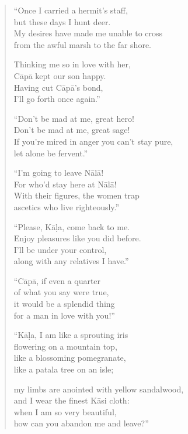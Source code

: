 \documentclass[12pt,openany]{book}%
\begin{document}
\begin{verse}%
“Once I carried a hermit’s staff, \\
but these days I hunt deer. \\
My desires have made me unable to cross \\
from the awful marsh to the far shore. 

Thinking me so in love with her, \\
\textsanskrit{Cāpā} kept our son happy. \\
Having cut \textsanskrit{Cāpā}’s bond, \\
I’ll go forth once again.” 

“Don’t be mad at me, great hero! \\
Don’t be mad at me, great sage! \\
If you’re mired in anger you can’t stay pure, \\
let alone be fervent.” 

“I’m going to leave \textsanskrit{Nālā}! \\
For who’d stay here at \textsanskrit{Nālā}! \\
With their figures, the women trap \\
ascetics who live righteously.” 

“Please, \textsanskrit{Kāḷa}, come back to me. \\
Enjoy pleasures like you did before. \\
I’ll be under your control, \\
along with any relatives I have.” 

“\textsanskrit{Cāpā}, if even a quarter \\
of what you say were true, \\
it would be a splendid thing \\
for a man in love with you!” 

“\textsanskrit{Kāḷa}, I am like a sprouting iris \\
flowering on a mountain top, \\
like a blossoming pomegranate, \\
like a patala tree on an isle; 

my limbs are anointed with yellow sandalwood, \\
and I wear the finest \textsanskrit{Kāsi} cloth: \\
when I am so very beautiful, \\
how can you abandon me and leave?” 


\end{verse}
\end{document}

